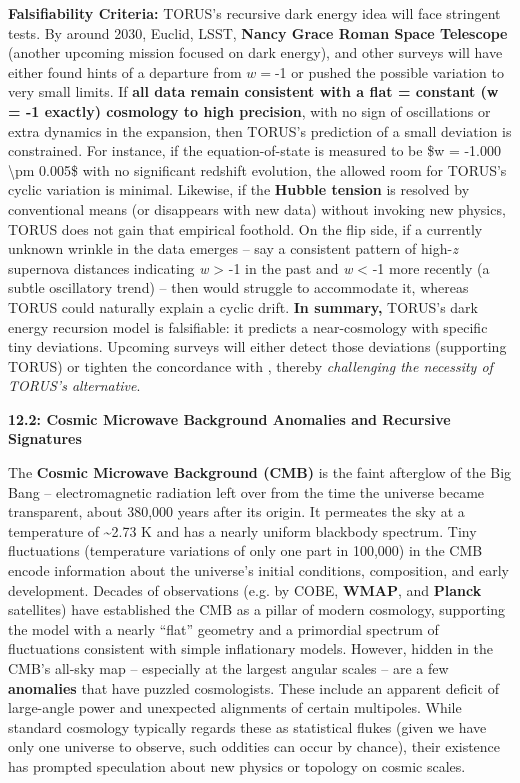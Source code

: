\documentclass[
]{article}
\begin{document}
{\textbf{Falsifiability Criteria:} TORUS's recursive dark energy idea
will face stringent tests. By around 2030, Euclid, LSST, \textbf{Nancy
Grace Roman Space Telescope} (another upcoming mission focused on dark
energy), and other surveys will have either found hints of a departure
from $w =$-1 or pushed the possible variation to very small
limits. If \textbf{all data remain consistent with a flat \Lambda = constant
(w = -1 exactly) cosmology to high precision}, with no sign of
oscillations or extra dynamics in the expansion, then TORUS's prediction
of a small deviation is constrained. For instance, if the
equation-of-state is measured to be \$w = -1.000 \textbackslash pm
0.005\$ with no significant redshift evolution, the allowed room for
TORUS's cyclic variation is minimal. Likewise, if the \textbf{Hubble
tension} is resolved by conventional means (or disappears with new data)
without invoking new physics, TORUS does not gain that empirical
foothold. On the flip side, if a currently unknown wrinkle in the data
emerges -- say a consistent pattern of high-\emph{z} supernova distances
indicating \emph{w} \textgreater{} -1 in the past and \emph{w}
\textless{} -1 more recently (a subtle oscillatory trend) -- then \LambdaCDM
would struggle to accommodate it, whereas TORUS could naturally explain
a cyclic drift. \textbf{In summary,} TORUS's dark energy recursion model
is falsifiable: it predicts a near-\LambdaCDM cosmology with specific tiny
deviations. Upcoming surveys will either detect those deviations
(supporting TORUS) or tighten the concordance with \LambdaCDM, thereby
\emph{challenging the necessity of TORUS's alternative}\hspace{0pt}.

\textbf{12.2: Cosmic Microwave Background Anomalies and Recursive
Signatures}

The \textbf{Cosmic Microwave Background (CMB)} is the faint afterglow of
the Big Bang -- electromagnetic radiation left over from the time the
universe became transparent, about 380,000 years after its origin. It
permeates the sky at a temperature of \textasciitilde2.73 K and has a
nearly uniform blackbody spectrum. Tiny fluctuations (temperature
variations of only one part in 100,000) in the CMB encode information
about the universe's initial conditions, composition, and early
development. Decades of observations (e.g. by COBE, \textbf{WMAP}, and
\textbf{Planck} satellites) have established the CMB as a pillar of
modern cosmology, supporting the \LambdaCDM model with a nearly ``flat''
geometry and a primordial spectrum of fluctuations consistent with
simple inflationary models. However, hidden in the CMB's all-sky map --
especially at the largest angular scales -- are a few \textbf{anomalies}
that have puzzled cosmologists. These include an apparent deficit of
large-angle power and unexpected alignments of certain multipoles. While
standard cosmology typically regards these as statistical flukes (given
we have only one universe to observe, such oddities can occur by
chance), their existence has prompted speculation about new physics or
topology on cosmic scales.

}
\end{document}

